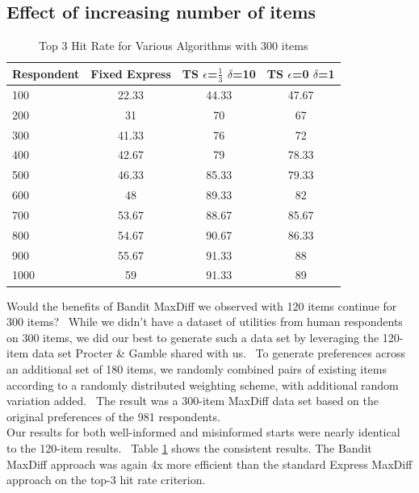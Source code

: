\documentclass[mksc,blindrev]{informs3} %
\begin{document}
\subsection{Effect of increasing number of items}
\begin{table}
\begin{center}
\begin{tabular}{l | c | c | c}
 Respondent& Fixed Express &  TS $\epsilon$=$\frac{1}{3}$ $\delta$=10  &TS $\epsilon$=0 $\delta$=1 \\
\hline
100	&	22.33	&	44.33	&	47.67	\\
200	&	31	&	70	&	67	\\	
300	&	41.33	&	76	&	72	\\	
400	&	42.67	&	79	&	78.33	\\	
500	&	46.33	&	85.33	&	79.33	\\
600	&	48	&	89.33	&	82	\\	
700	&	53.67	&	88.67	&	85.67	\\
800	&	54.67	&	90.67	&	86.33	\\
900	&	55.67	&	91.33	&	88	\\
1000	&	59	&	91.33	&	89	\\	
\hline
\end{tabular}
\end{center}
\caption{Top 3 Hit Rate for Various Algorithms with 300 items}
\label{table:300top3}
\end{table}
Would the benefits of Bandit MaxDiff we observed with 120 items continue for 300 items?  While we didn't have a dataset of utilities from human respondents on 300 items, we did our best to generate such a data set by leveraging the 120-item data set Procter \& Gamble shared with us.  To generate preferences across an additional set of 180 items, we randomly combined pairs of existing items according to a randomly distributed weighting scheme, with additional random variation added.  The result was a 300-item MaxDiff data set based on the original preferences of the 981 respondents.\\
Our results for both well-informed and misinformed starts were nearly identical to the 120-item results.  Table \ref{table:300top3} shows the consistent results. The Bandit MaxDiff approach was again 4x more efficient than the standard Express MaxDiff approach on the top-3 hit rate criterion. \\
\end{document}
